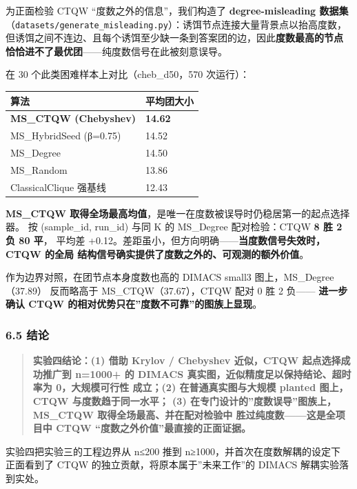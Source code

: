 \documentclass[
  11pt,
]{ctexart}
\newcounter{none} %
\begin{document}
为正面检验 CTQW ``度数之外的信息''，我们构造了 \textbf{degree-misleading
数据集}
（\texttt{datasets/generate\_misleading.py}）：诱饵节点连接大量背景点以抬高度数，
但诱饵之间不连边、且每个诱饵至少缺一条到答案团的边，因此\textbf{度数最高的节点
恰恰进不了最优团}------纯度数信号在此被刻意误导。

在 30 个此类困难样本上对比（cheb\_d50，570 次运行）：

{\def\LTcaptype{none} %
\begin{longtable}[]{@{}ll@{}}
\toprule\noalign{}
算法 & 平均团大小 \\
\midrule\noalign{}
\endhead
\bottomrule\noalign{}
\endlastfoot
\textbf{MS\_CTQW (Chebyshev)} & \textbf{14.62} \\
MS\_HybridSeed (β=0.75) & 14.52 \\
MS\_Degree & 14.50 \\
MS\_Random & 13.86 \\
ClassicalClique 强基线 & 12.43 \\
\end{longtable}
}

\textbf{MS\_CTQW
取得全场最高均值}，是唯一在度数被误导时仍稳居第一的起点选择器。 按
(sample\_id, run\_id) 与同 K 的 MS\_Degree 配对检验：CTQW \textbf{8 胜 2
负 80 平}， 平均差
+0.12。差距虽小，但方向明确------\textbf{当度数信号失效时，CTQW 的全局
结构信号确实提供了度数之外的、可观测的额外价值}。

作为边界对照，在团节点本身度数也高的 DIMACS small3
图上，MS\_Degree（37.89） 反而略高于 MS\_CTQW（37.67），CTQW 配对 0 胜 2
负------ \textbf{进一步确认 CTQW
的相对优势只在''度数不可靠''的图族上显现}。

\subsubsection{6.5 结论}\label{ux7ed3ux8bba-1}

\begin{quote}
\textbf{实验四结论：(1) 借助 Krylov / Chebyshev 近似，CTQW
起点选择成功推广到 n=1000+ 的 DIMACS
真实图，近似精度足以保持结论、超时率为 0，大规模可行性 成立；(2)
在普通真实图与大规模 planted 图上，CTQW 与度数趋于同一水平； (3)
在专门设计的''度数误导''图族上，MS\_CTQW 取得全场最高、并在配对检验中
胜过纯度数------这是全项目中 CTQW ``度数之外价值''最直接的正面证据。}
\end{quote}

实验四把实验三的工程边界从 n≤200 推到 n≥1000，并首次在度数解耦的设定下
正面看到了 CTQW 的独立贡献，将原本属于''未来工作''的 DIMACS
解耦实验落到实处。
\end{document}
